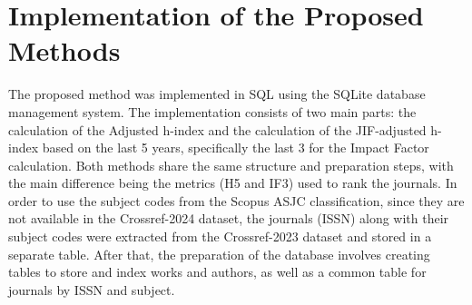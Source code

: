 \section{Implementation of the Proposed Methods}
%
%
%
%

The proposed method was implemented in SQL using the SQLite database management
system. The implementation consists of two main parts: the calculation of the
Adjusted h-index and the calculation of the JIF-adjusted h-index based on the
last 5 years, specifically the last 3 for the Impact Factor calculation. Both
methods share the same structure and preparation steps, with the main
difference being the metrics (H5 and IF3) used to rank the journals. In order
to use the subject codes from the Scopus ASJC classification, since they are
not available in the Crossref-2024 dataset, the journals (ISSN) along with
their subject codes were extracted from the Crossref-2023 dataset and stored in
a separate table. After that, the preparation of the database involves creating
tables to store and index works and authors, as well as a common table for
journals by ISSN and subject.

